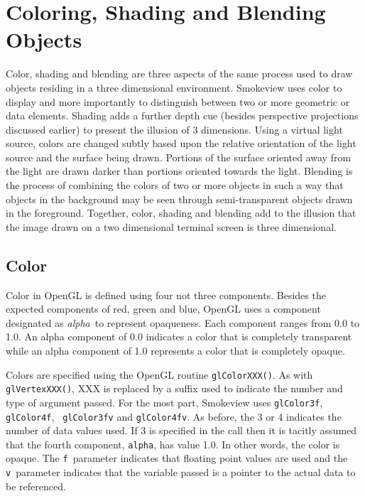 \documentclass[11pt,twoside]{book}
\begin{document}
\section{Coloring, Shading and Blending Objects}
Color, shading and blending are three aspects of the same process
used to draw objects residing in a three dimensional environment.
Smokeview uses color to display and more importantly to
distinguish between two or more geometric or data elements.
Shading adds a further depth cue (besides perspective projections
discussed earlier) to present the illusion of 3 dimensions.  Using
a virtual light source, colors are changed subtly based upon the
relative orientation of the light source and the surface being
drawn.  Portions of the surface oriented away from the light are
drawn darker than portions oriented towards the light.  Blending
is the process of combining the colors of two or more objects in
such a way that objects in the background may be seen through
semi-transparent objects drawn in the foreground.  Together,
color, shading and blending add to the illusion that the image
drawn on a two dimensional terminal screen is three dimensional.

\subsection{Color}
Color in OpenGL is defined using four not three components.
Besides the expected components of red, green and blue, OpenGL
uses a component designated as {\em alpha}\ to represent
opaqueness. Each component ranges from 0.0 to 1.0. An alpha
component of 0.0 indicates a color that is completely transparent
while an alpha component of 1.0 represents a color that is
completely opaque.

Colors are specified using the OpenGL routine {\tt glColorXXX()}.
As with {\tt glVertexXXX()}, XXX is replaced by a suffix used to
indicate the number and type of argument passed.  For the most
part, Smokeview uses {\tt glColor3f}, {\tt glColor4f}, {\tt
glColor3fv} and {\tt glColor4fv}.  As before, the 3 or 4 indicates
the number of data values used.  If 3 is specified in the call
then it is tacitly assumed that the fourth component, {\tt alpha},
has value 1.0.  In other words, the color is opaque.  The {\tt f}\
parameter indicates that floating point values are used and the
{\tt v}\ parameter indicates that the variable passed is a pointer
to the actual data to be referenced.
\end{document}

